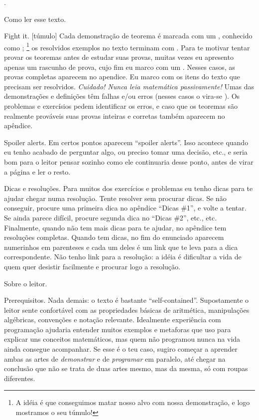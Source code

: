 
\chapteroid \prefacename.

\sectionoid Como ler esse texto.

\blah Fight it.
[túmulo]%
Cada demonstração de teorema é marcada com um \symq{$\qedsymbol$},
conhecido como ;%
\footnote{A idéia é que conseguimos matar nosso alvo com nossa demonstração,
e logo mostramos o seu túmulo!}
os resolvidos exemplos no texto terminam com \symq{$\qexsymbol$}.
Para te motivar tentar provar os teoremas antes de estudar suas provas,
muitas vezes eu apresento apenas um rascunho de prova,
cujo fim eu marco com um \symq{$\qessymbol$}.
Nesses casos, as provas completas aparecem no apendice.
Eu marco com \symq{$\activitysymbol$} os itens do texto que
precisam ser resolvidos.
\endgraf
\emph{Cuidado! Nunca leia matemática passivamente!}
Umas das demonstrações e definições têm falhas e/ou erros
(nesses casos o \symq{$\qedsymbol$} vira-se \symq{$\mistakesymbol$}).
Os problemas e exercísios pedem identificar os erros,
e caso que os teoremas são realmente prováveis suas provas
inteiras e corretas também aparecem no apêndice.

\blah Spoiler alerts.
Em certos pontos aparecem ``spoiler alerts''.
Isso acontece quando eu tenho acabado de perguntar algo, ou preciso
tomar uma decisão, etc., e seria bom para o leitor pensar sozinho
como ele continuaria desse ponto, antes de virar a página
e ler o resto.

\blah Dicas e resoluções.
Para muitos dos exercícios e problemas eu tenho dicas para te ajudar
chegar numa resolução.  Tente resolver sem procurar dicas.
Se não conseguir, procure uma primeira dica no apêndice ``Dicas \#1'',
e volte a tentar.
Se ainda parece difícil, procure segunda dica no ``Dicas \#2'', etc., etc.
Finalmente, quando não tem mais dicas para te ajudar,
no apêndice tem resoluções completas.
Quando tem dicas, no fim do enunciado aparecem numerinhos em parenteses
e cada um deles é um link que te leva para a dica correspondente.
Não tenho link para a resolução: a idéia é dificultar a vida de quem
quer desistir facilmente e procurar logo a resolução.

\endsectionoid

\sectionoid Sobre o leitor.

\blah Prerequisitos.
Nada demais: o texto é bastante ``self-contained''.
Supostamente o leitor sente confortável com as propriedades básicas
de aritmética, manipulações algébricas, convenções e notação relevante.
Idealmente experiência com programação ajudaria entender muitos exemplos
e metaforas que uso para explicar uns conceitos matemáticos, mas quem
não programou nunca na vida ainda consegue acompanhar.
Se esse é o teu caso, sugiro começar a aprender ambas as artes de
\emph{demonstrar} e de \emph{programar} em paralelo, até chegar
na conclusão que não se trata de duas artes mesmo, mas da mesma,
só com roupas diferentes.

\endsectionoid

\endchapteroid
